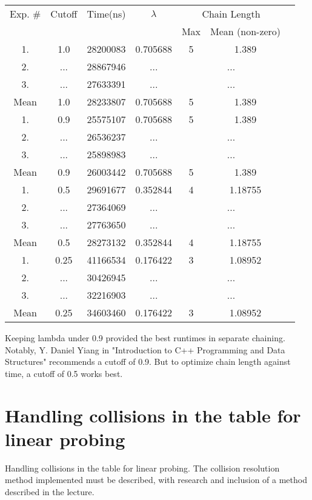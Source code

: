 \documentclass[12pt]{article}
\begin{document}
\begin{center}
\begin{tabular}{|c|c|c|c|c|c|c|}
\hline
Exp. \# & Cutoff & Time(ns) & $\lambda$ & \multicolumn{2}{|c|}{Chain Length} \\
 & & & & Max & Mean (non-zero) \\
\hline
1. & 1.0 & 28200083 & 0.705688 & 5 & 1.389\\
2. & ... & 28867946 & ... & \multicolumn{2}{c|}{...} \\
3. & ... & 27633391 & ... & \multicolumn{2}{c|}{...} \\
Mean & 1.0 & 28233807 & 0.705688 & 5 & 1.389\\
\hline
1. & 0.9 & 25575107 & 0.705688 & 5 & 1.389 \\
2. & ... & 26536237 & ... & \multicolumn{2}{c|}{...} \\
3. & ... & 25898983 & ... & \multicolumn{2}{c|}{...} \\
Mean & 0.9 & 26003442 & 0.705688 & 5 & 1.389 \\
\hline
1. & 0.5 & 29691677 & 0.352844 & 4 & 1.18755\\
2. & ... & 27364069 & ... & \multicolumn{2}{c|}{...} \\
3. & ... & 27763650 & ... & \multicolumn{2}{c|}{...} \\
Mean & 0.5 & 28273132 & 0.352844 & 4 & 1.18755\\
\hline
1. & 0.25 & 41166534 & 0.176422 & 3 & 1.08952\\
2. & ... & 30426945 & ... & \multicolumn{2}{c|}{...} \\
3. & ... & 32216903 & ... & \multicolumn{2}{c|}{...} \\
Mean & 0.25 & 34603460 & 0.176422 & 3 & 1.08952\\
\hline
\end{tabular}
\end{center}

Keeping lambda under 0.9 provided the best runtimes in separate chaining. Notably, Y. Daniel Yiang in "Introduction to C++ Programming and Data Structures" recommends a cutoff of 0.9. But to optimize chain length against time, a cutoff of 0.5 works best.

\section{Handling collisions in the table for linear probing}
Handling collisions in the table for linear probing. The collision resolution method implemented must be
described, with research and inclusion of a method described in the lecture.
\end{document}
